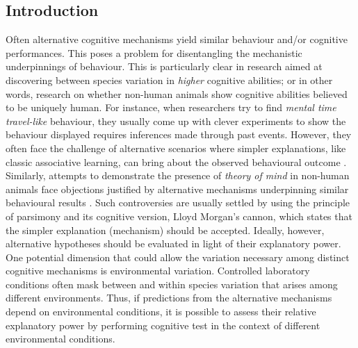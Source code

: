\documentclass[]{rsos}%
\begin{document}
\providecommand{\EndFirstPage}{%
}

\maketitle

\hypertarget{introduction}{%
\subsection{Introduction}\label{introduction}}

Often alternative cognitive mechanisms yield similar behaviour and/or cognitive
performances. This poses a problem for disentangling the mechanistic
underpinnings of behaviour. This is particularly clear in research aimed at
discovering between species variation in \emph{higher} cognitive abilities; or
in other words, research on whether non-human animals show cognitive
abilities believed to be uniquely human. For instance, when researchers
try to find \emph{mental time travel-like} behaviour, they usually come up with
clever experiments to show the behaviour displayed requires inferences made
through past events\citep{dally_Foodcaching_2006}. However, they often face the
challenge of alternative scenarios where simpler explanations,
like classic associative learning, can bring about the
observed behavioural outcome \citep{suddendorf_Evolution_2007}. Similarly, attempts
to demonstrate the presence of \emph{theory of mind} in non-human animals
face objections justified by alternative mechanisms underpinning
similar behavioural results \citep{heyes_Theory_1998}.
Such controversies are usually settled by using the principle
of parsimony and its cognitive version,
Lloyd Morgan's cannon, which states that the simpler explanation (mechanism)
should be accepted. Ideally, however, alternative hypotheses should be evaluated
in light of their explanatory power. One potential dimension that could allow
the variation necessary among distinct cognitive mechanisms is environmental
variation. Controlled laboratory conditions often mask between and within
species variation that arises among different environments. Thus, if
predictions from the alternative mechanisms depend on environmental
conditions, it is possible to assess their relative explanatory power
by performing cognitive test in the context of
different environmental conditions.
\end{document}
